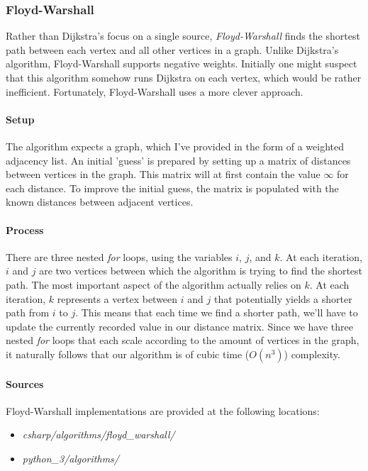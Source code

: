 \documentclass{article}
\begin{document}
{\subsubsection{Floyd-Warshall}
Rather than Dijkstra's focus on a single source, {\em Floyd-Warshall} finds the shortest path between each vertex
and all other vertices in a graph. Unlike Dijkstra's algorithm, Floyd-Warshall supports negative weights.
Initially one might suspect that this algorithm somehow runs Dijkstra on each vertex, which would be rather
inefficient. Fortunately, Floyd-Warshall uses a more clever approach.

\paragraph{Setup}
The algorithm expects a graph, which I've provided in the form of a weighted adjacency list. An initial 'guess' is
prepared by setting up a matrix of distances between vertices in the graph. This matrix will at first contain the
value \(\infty\) for each distance. To improve the initial guess, the matrix is populated with the known distances
between adjacent vertices.

\paragraph{Process}
There are three nested {\em for} loops, using the variables \(i\), \(j\), and \(k\). At each iteration,
\(i\) and \(j\) are two vertices between which the algorithm is trying to find the shortest path. The most important
aspect of the algorithm actually relies on \(k\). At each iteration, \(k\) represents a vertex between \(i\) and
\(j\) that potentially yields a shorter path from \(i\) to \(j\). This means that each time we find a shorter path,
we'll have to update the currently recorded value in our distance matrix. Since we have three nested {\em for} loops
that each scale according to the amount of vertices in the graph, it naturally follows that our algorithm is of
cubic time (\(O(n^3)\)) complexity.

\begin{samepage}
  \paragraph{Sources}
  Floyd-Warshall implementations are provided at the following locations:
  \begin{itemize}
  \item{{\em csharp/algorithms/floyd\_warshall/}}
  \item{{\em python\_3/algorithms/}}
  \end{itemize}
\end{samepage}


}
\end{document}
